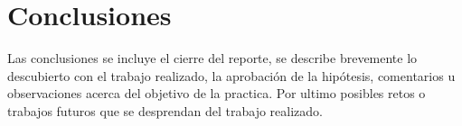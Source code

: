 \chapter{Conclusiones}
Las conclusiones se incluye el cierre del reporte, se describe brevemente lo descubierto con el trabajo realizado, la aprobación de la hipótesis, comentarios u observaciones acerca del objetivo de la practica. Por ultimo posibles retos o trabajos futuros que se desprendan del trabajo realizado.
